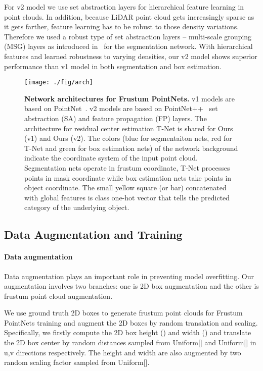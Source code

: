 \documentclass[10pt,twocolumn,letterpaper]{article}
\begin{document}
For v2 model we use set abstraction layers for hierarchical feature learning in point clouds. In addition, because LiDAR point cloud gets increasingly sparse as it gets farther, feature learning has to be robust to those density variations. Therefore we used a robust type of set abstraction layers -- multi-scale grouping (MSG) layers as introduced in~\cite{qi2017pointnetplusplus} for the segmentation network. With hierarchical features and learned robustness to varying densities, our v2 model shows superior performance than v1 model in both segmentation and box estimation.

\begin{figure*}
    \centering
    \texttt{[image: ./fig/arch]}
    \caption{\textbf{Network architectures for Frustum PointNets.} v1 models are based on PointNet~\cite{qi2017pointnet}. v2 models are based on PointNet++~\cite{qi2017pointnetplusplus} set abstraction (SA) and feature propagation (FP) layers. The architecture for residual center estimation T-Net is shared for Ours (v1) and Ours (v2). The colors (blue for segmentaiton nets, red for T-Net and green for box estimation nets) of the network background indicate the coordinate system of the input point cloud. Segmentation nets operate in frustum coordinate, T-Net processes points in mask coordinate while box estimation nets take points in object coordinate. The small yellow square (or bar) concatenated with global features is class one-hot vector that tells the predicted category of the underlying object.}
    \label{fig:arch}
\end{figure*}

\subsection{Data Augmentation and Training}

\paragraph{Data augmentation} Data augmentation plays an important role in preventing model overfitting. Our augmentation involves two branches: one is 2D box augmentation and the other is frustum point cloud augmentation.

We use ground truth 2D boxes to generate frustum point clouds for Frustum PointNets training and augment the 2D boxes by random translation and scaling. Specifically, we firstly compute the 2D box height () and width () and translate the 2D box center by random distances sampled from Uniform[] and Uniform[] in u,v directions respectively. The height and width are also augmented by two random scaling factor sampled from Uniform[].
\end{document}
